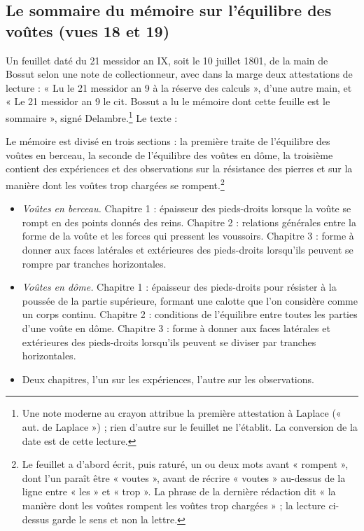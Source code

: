 \documentclass[11pt,a4paper]{article}
\begin{document}
\subsection*{Le sommaire du mémoire sur l'équilibre des voûtes (vues 18 et 19)}

Un feuillet daté du 21 messidor an IX, soit le 10 juillet 1801, de la main
de Bossut selon une note de collectionneur, avec dans la marge deux
attestations de lecture : « Lu le 21 messidor an 9 à la réserve des
calculs », d'une autre main, et « Le 21 messidor an 9 le cit. Bossut a lu le
mémoire dont cette feuille est le sommaire », signé Delambre.\footnote{Une
note moderne au crayon attribue la première attestation à Laplace
(« aut. de Laplace ») ; rien d'autre sur le feuillet ne l'établit. La
conversion de la date est de cette lecture.} Le texte :

Le mémoire est divisé en trois sections : la première traite de l'équilibre
des voûtes en berceau, la seconde de l'équilibre des voûtes en dôme, la
troisième contient des expériences et des observations sur la résistance des
pierres et sur la manière dont les voûtes trop chargées se
rompent.\footnote{Le feuillet a d'abord écrit, puis raturé, un ou deux mots
avant « rompent », dont l'un paraît être « voutes », avant de récrire « voutes »
au-dessus de la ligne entre « les » et « trop ». La phrase de la dernière
rédaction dit « la manière dont les voûtes rompent les voûtes trop
chargées » ; la lecture ci-dessus garde le sens et non la lettre.}

\begin{itemize}
  \item[I.] \emph{Voûtes en berceau.} Chapitre 1 : épaisseur des pieds-droits
  lorsque la voûte se rompt en des points donnés des reins. Chapitre 2 :
  relations générales entre la forme de la voûte et les forces qui pressent
  les voussoirs. Chapitre 3 : forme à donner aux faces latérales et
  extérieures des pieds-droits lorsqu'ils peuvent se rompre par tranches
  horizontales.
  \item[II.] \emph{Voûtes en dôme.} Chapitre 1 : épaisseur des pieds-droits
  pour résister à la poussée de la partie supérieure, formant une calotte que
  l'on considère comme un corps continu. Chapitre 2 : conditions de
  l'équilibre entre toutes les parties d'une voûte en dôme. Chapitre 3 : forme
  à donner aux faces latérales et extérieures des pieds-droits lorsqu'ils
  peuvent se diviser par tranches horizontales.
  \item[III.] Deux chapitres, l'un sur les expériences, l'autre sur les
  observations.
\end{itemize}
\end{document}
